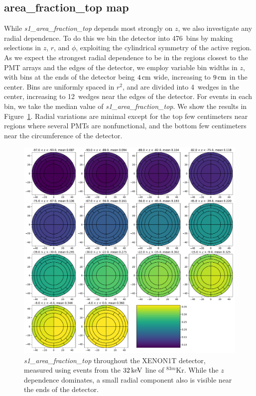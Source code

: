 \subsection{area\_fraction\_top map}

While \textit{s1\_area\_fraction\_top} depends most strongly on $z$, we also investigate any radial dependence. To do this we bin the detector into 476~bins by making selections in $z$, $r$, and $\phi$, exploiting the cylindrical symmetry of the active region. As we expect the strongest radial dependence to be in the regions closest to the PMT arrays and the edges of the detector, we employ variable bin widths in $z$, with bins at the ends of the detector being $4\,\mathrm{cm}$ wide, increasing to $9\,\mathrm{cm}$ in the center. Bins are uniformly spaced in $r^2$, and are divided into 4~wedges in the center, increasing to 12~wedges near the edges of the detector. For events in each bin, we take the median value of \textit{s1\_area\_fraction\_top}. We show the results in Figure~\ref{fig:s1_aft_map}. Radial variations are minimal except for the top few centimeters near regions where several PMTs are nonfunctional, and the bottom few centimeters near the circumference of the detector.

\begin{figure}[htpb]
\centering
    \includegraphics[width=\textwidth]{figures/s1aft/s1aft_binned_44}
    \caption{\textit{s1\_area\_fraction\_top} throughout the XENON1T detector, measured using events from the $32\,\mathrm{keV}$ line of $^{83m}$Kr. While the $z$ dependence dominates, a small radial component also is visible near the ends of the detector.}\label{fig:s1_aft_map}
\end{figure}

